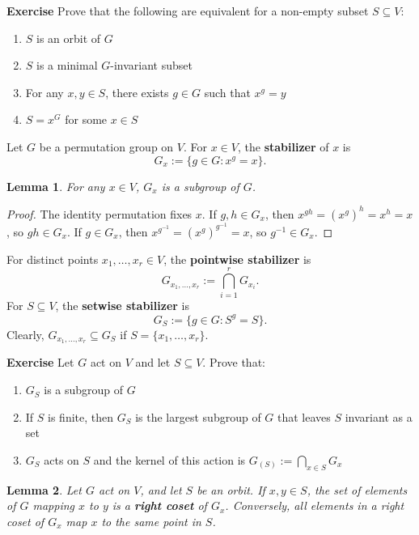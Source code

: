 \documentclass[12pt,a4paper,openany]{book}
\newtheorem{lemma}{Lemma}[section]
\begin{document}
\bigskip\noindent\textbf{Exercise}
Prove that the following are equivalent for a non-empty subset $S \subseteq V$:
\begin{enumerate}
\item $S$ is an orbit of $G$
\item $S$ is a minimal $G$-invariant subset
\item For any $x, y \in S$, there exists $g \in G$ such that $x^g = y$
\item $S = x^G$ for some $x \in S$
\end{enumerate}




Let $G$ be a permutation group on $V$. For $x \in V$, the \textbf{stabilizer} of $x$ is
\[
G_x := \{ g \in G : x^g = x \}.
\]

\begin{lemma}\label{lem:stabilizer-subgroup}
For any $x \in V$, $G_x$ is a subgroup of $G$.
\end{lemma}

\begin{proof}
The identity permutation fixes $x$. If $g,h \in G_x$, then $x^{gh} = (x^g)^h = x^h = x$, so $gh \in G_x$. If $g \in G_x$, then $x^{g^{-1}} = (x^g)^{g^{-1}} = x$, so $g^{-1} \in G_x$.
\end{proof}

For distinct points $x_1, \dots, x_r \in V$, the \textbf{pointwise stabilizer} is
\[
G_{x_1, \dots, x_r} := \bigcap_{i=1}^r G_{x_i}.
\]
For $S \subseteq V$, the \textbf{setwise stabilizer} is
\[
G_S := \{ g \in G : S^g = S \}.
\]
Clearly, $G_{x_1, \dots, x_r} \subseteq G_S$ if $S = \{x_1, \dots, x_r\}$.

\bigskip\noindent\textbf{Exercise}
Let $G$ act on $V$ and let $S \subseteq V$. Prove that:
\begin{enumerate}
\item $G_S$ is a subgroup of $G$
\item If $S$ is finite, then $G_S$ is the largest subgroup of $G$ that leaves $S$ invariant as a set
\item $G_S$ acts on $S$ and the kernel of this action is $G_{(S)} := \bigcap_{x \in S} G_x$
\end{enumerate}




\begin{lemma}\label{lem:coset-mapping}
Let $G$ act on $V$, and let $S$ be an orbit. If $x, y \in S$, the set of elements of $G$ mapping $x$ to $y$ is a \textbf{right coset} of $G_x$. Conversely, all elements in a right coset of $G_x$ map $x$ to the same point in $S$.
\end{lemma}
\end{document}
